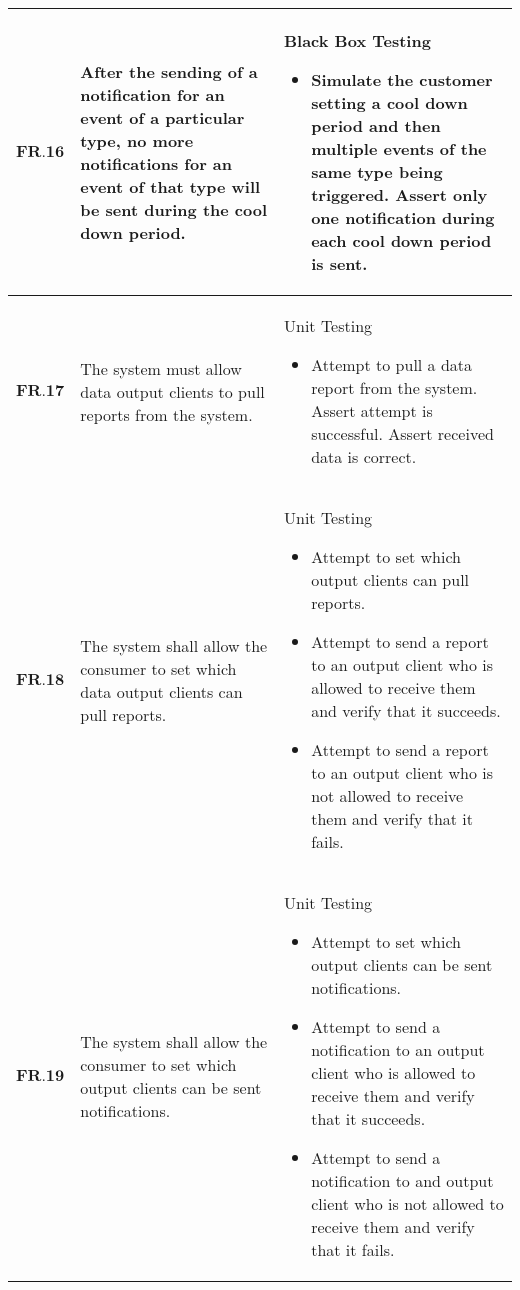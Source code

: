 \begin{longtable}[H]{| p{1.5cm}| p{4.5cm}| p{10.5cm}|}
        $\textbf{FR.16}$ & After the sending of a notification for an event of a particular type, no more notifications for an event of that type will be sent during the cool down period. & Black Box Testing\begin{itemize}\item Simulate the customer setting a cool down period and then multiple events of the same type being triggered. Assert only one notification during each cool down period is sent.\end{itemize}                                                                                                                    \\ \hline
        $\textbf{FR.17}$ & The system must allow data output clients to pull reports from the system.                                                                                       & Unit Testing\begin{itemize}\item Attempt to pull a data report from the system. Assert attempt is successful. Assert received data is correct.\end{itemize}                                                                                                                                                                                          \\ \hline
       $ \textbf{FR.18}$ & The system shall allow the consumer to set which data output clients can pull reports.                                                                           & Unit Testing\begin{itemize}\item Attempt to set which output clients can pull reports.\item Attempt to send a report to an output client who is allowed to receive them and verify that it succeeds.\item Attempt to send a report to an output client who is not allowed to receive them and verify that it fails.\end{itemize}                 \\ \hline
    	$\textbf{FR.19}$ & The system shall allow the consumer to set which output clients can be sent notifications.                                                                       & Unit Testing\begin{itemize}\item Attempt to set which output clients can be sent notifications.\item Attempt to send a notification to an output client who is allowed to receive them and verify that it succeeds.\item Attempt to send a notification to and output client who is not allowed to receive them and verify that it fails.\end{itemize} \\ \hline
\end{longtable}
